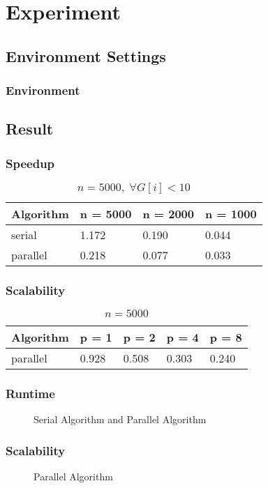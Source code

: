 \section{Experiment}

\subsection{Environment Settings}
\begin{frame}
    \frametitle{Environment}
\end{frame}

\subsection{Result}
\begin{frame}
    \frametitle{Speedup}
    \begin{table}
    	\caption{$n = 5000, \; \forall G[i] < 10$}
		\begin{tabular}{| l | l | l | l |}
			\hline
			Algorithm 		& n = 5000 & n = 2000 & n = 1000\\ \hline
			serial 			& 1.172 & 0.190 & 0.044\\ \hline
			parallel 	& 0.218 & 0.077 & 0.033\\ \hline
		\end{tabular}
	\end{table}
\end{frame}

\begin{frame}
    \frametitle{Scalability}
    \begin{table}
    	\caption{$n = 5000$}
		\begin{tabular}{| l | l | l | l | l |}
			\hline
			Algorithm 	& p = 1 & p = 2 & p = 4 & p = 8\\ \hline
			parallel 	& 0.928  & 0.508 & 0.303 & 0.240 \\ \hline
		\end{tabular}
	\end{table}
\end{frame}

\begin{frame}
	\frametitle{Runtime}
	\begin{figure}[!ht]
		\centering
		\subfigure[Runtime]{
			
			\label{fig:fig-parallel}
		}
		\caption{Serial Algorithm and Parallel Algorithm}
		\label{fig:light_weight}
	\end{figure}
\end{frame}

\begin{frame}
	\frametitle{Scalability}
	\begin{figure}[!ht]
		\centering
		\subfigure[Scalability]{
			
			\label{fig:fig-parallel}
		}
		\caption{Parallel Algorithm}
		\label{fig:light_weight}
	\end{figure}
\end{frame}